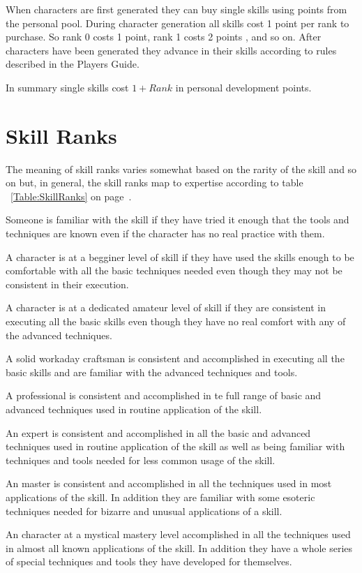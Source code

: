 When characters are first generated they can buy single skills
using points from the personal pool. During character generation all skills cost 1 point per
rank to purchase. So rank 0 costs 1 point, rank 1 costs 2 points , and so
on. After characters have been generated they advance in their skills
according to rules described in the Players Guide.

In summary single skills cost $ 1 + Rank $ in personal development points.

\section{Skill Ranks}

The meaning of skill ranks varies somewhat based on the rarity of the skill and
so on but, in general, the skill ranks map to expertise according to table
~\ref{Table:SkillRanks} on page~\pageref{Table:SkillRanks}.



Someone is familiar with the skill if they have tried it enough that the
tools and techniques are known even if the character has no real practice
with them.

A character is at a begginer level of skill if they have used the skills
enough to be comfortable with all the basic techniques needed even though
they may not be consistent in their execution.

A character is at a dedicated amateur level of skill if they are consistent
in executing all the basic skills even though they have no real comfort
with any of the advanced techniques.

A solid workaday craftsman is consistent and accomplished 
in executing all the basic skills and are familiar with the advanced
techniques and tools.

A professional is consistent and accomplished in te full range of
basic and advanced techniques used in routine application of the skill.

An expert is consistent and accomplished in all the basic and
advanced techniques used in routine application of the skill as well as
being familiar with techniques and tools needed for less common usage of
the skill.

An master is consistent and accomplished in all the techniques used in
most applications of the skill. In addition they are familiar with some
esoteric techniques needed for bizarre and unusual applications of a skill.

An character at a mystical mastery level accomplished in all the techniques used in
almost all known applications of the skill. In addition they have a whole
series of special techniques and tools they have developed for themselves.

